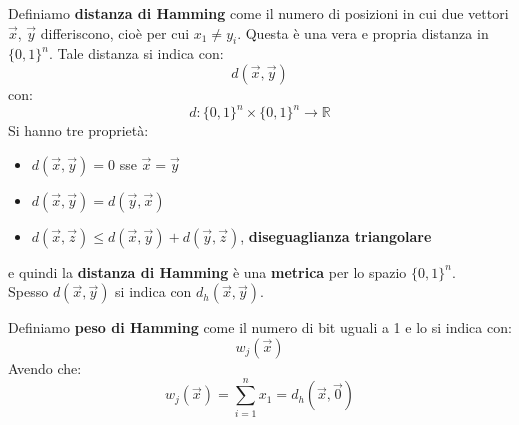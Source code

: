 \documentclass[a4paper,12pt, oneside]{book}
\begin{document}
\begin{definizione}
  Definiamo \textbf{distanza di Hamming} come il numero di posizioni in cui due
  vettori $\vec{x}$, $\vec{y}$ differiscono, cioè per cui $x_1\neq y_i$. Questa
  è una vera e propria distanza in $\{0,1\}^n$. Tale distanza si indica con:
  \[d(\vec{x},\vec{y})\]
  con:
  \[d:\{0,1\}^n\times\{0,1\}^n\to\mathbb{R}\]
  Si hanno tre proprietà:
  \begin{itemize}
    \item $d(\vec{x},\vec{y})=0$ sse $\vec{x}=\vec{y}$
    \item $d(\vec{x},\vec{y})=d(\vec{y},\vec{x})$
    \item $d(\vec{x},\vec{z})\leq d(\vec{x},\vec{y})+d(\vec{y},\vec{z})$,
    \textbf{diseguaglianza triangolare}
  \end{itemize}
  e quindi la \textbf{distanza di Hamming} è una \textbf{metrica} per lo spazio
  $\{0,1\}^n$.\\
  Spesso $d(\vec{x},\vec{y})$ si indica con $d_h(\vec{x},\vec{y})$.
\end{definizione}
\begin{definizione}
  Definiamo \textbf{peso di Hamming} come il numero di bit uguali a 1 e lo si
  indica con:
  \[w_j(\vec{x})\]
  Avendo che:
  \[w_j(\vec{x})=\sum_{i=1}^n x_1=d_h(\vec{x},\vec{0})\]
\end{definizione}
\end{document}
